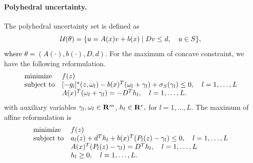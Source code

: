 \documentclass[11pt]{article}
\newcommand{\RC}[1]{\textcolor{black}{#1}}
\begin{document}
\begin{appendices}
\paragraph{Polyhedral uncertainty.}
The polyhedral uncertainty set is defined as
\RC{\begin{equation*}
    \uncset(\theta) = \{ u = A\RC{(x)}v+b\RC{(x)} \mid Dv \leq d, \quad u \in S\},\end{equation*}
where $\theta = (A(\cdot),b(\cdot),D,d)$.}
For the maximum of concave constraint, we have the following reformulation.
\begin{equation*}
\begin{array}{ll}
	{\text{minimize}} & f(z)\\
	\mbox{subject to} & [-g_l]^\star(z,\omega_l) - b\RC{(x)}^T(\omega_l + \gamma_l) + \sigma_S(\gamma_l) \leq 0, \quad l = 1,\dots,L\\
	 &A\RC{(x)}^T(\omega_l+ \gamma_l) = -D^Th_l,\quad l = 1,\dots,L.
\end{array}
\end{equation*}
with auxiliary variables $\gamma_l, \omega_l \in {\mathbf R}^m$, $h_l \in {\mathbf R}^{r}, $ for $l = 1,\dots,L$. The maximum of affine reformulation is
\begin{equation*}
	\label{eq:poly_max}
	\begin{array}{ll}
		\mbox{minimize} & f(z)\\
		\mbox{subject to} &  a_l(z) + d^Th_l + b\RC{(x)}^T( P_l(z)-\gamma_l)\le 0, \quad l = 1,\dots,L\\
		& A\RC{(x)}^T(P_l(z)-\gamma_l) = D^Th_l , \quad l = 1,\dots,L\\
		& h_l \geq 0, \quad l = 1,\dots,L.
	\end{array}
\end{equation*}



\end{appendices}
\end{document}
